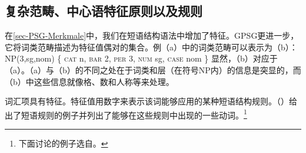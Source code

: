 \subsection{复杂范畴、中心语特征原则以及\xbarc 规则}
\label{sec-complex-categories-gpsg}

在\ref{sec-PSG-Merkmale}中，我们在短语结构语法中增加了特征。GPSG更进一步，它将词类范畴描述为特征值偶对的集合。例（a）中的词类范畴可以表示为（b）：
\eal
\ex NP(3,sg,{nom})
\ex \{ \textsc{cat} n, \textsc{bar} 2, \textsc{per} 3, \textsc{num} sg, \textsc{case} nom \} 
\zl
显然，（b）对应于（a）。（a）与（b）的不同之处在于词类和\xbarc 层（在符号NP内）的信息是突显的，而（b）中这些信息就像格、数和人称等来处理。

词汇项具有\subcatc 特征。特征值用数字来表示该词能够应用的某种短语结构规则。（）给出了短语规则的例子并列出了能够在这些规则中出现的一些动词。\footnote{%
下面讨论的例子选自。
}

